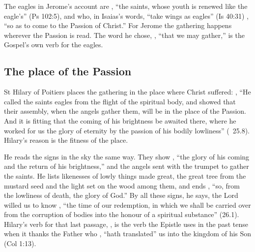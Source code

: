 The eagles in Jerome's account are , ``the saints, whose youth is renewed like the eagle's'' (Ps
102:5), and who, in Isaias's words, ``take wings as eagles'' (Is 40:31)
, ``so as to come to the Passion of
Christ.'' For Jerome the gathering happens wherever the Passion is read. The
word he chose, , ``that we may gather,'' is the Gospel's
own verb for the eagles.

\subsection{The place of the Passion}
\label{sec:body-hilary}

St Hilary of Poitiers places the gathering in the place where Christ
suffered: , ``He called the
saints eagles from the flight of the spiritual body, and showed that their
assembly, when the angels gather them, will be in the place of the Passion.
And it is fitting that the coming of his brightness be awaited there, where he
worked for us the glory of eternity by the passion of his bodily lowliness''
(~25.8). Hilary's reason is the fitness of the place.

He reads the signs in the sky the same way. They show , ``the glory of his coming and the return of his
brightness,'' and the angels sent with the trumpet to gather the saints. He
lists likenesses of lowly things made great, the great tree from the mustard
seed and the light set on the wood among them, and ends , ``so, from the lowliness of death, the glory of
God.'' By all these signs, he says, the Lord willed us to know
, ``the time of our redemption, in which we
shall be carried over from the corruption of bodies into the honour of a
spiritual substance'' (26.1). Hilary's verb for that last passage,
, is the verb the Epistle uses in the past tense when it
thanks the Father who , ``hath translated'' us into the
kingdom of his Son (Col 1:13).

